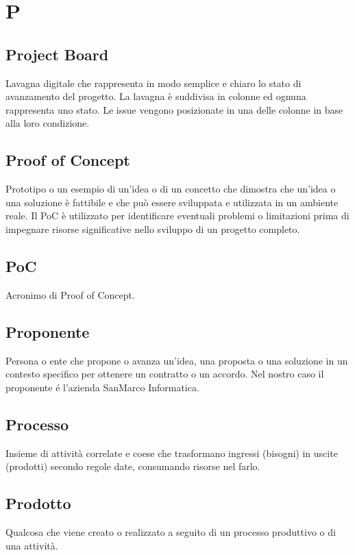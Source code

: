 \section{P}
\subsection{Project Board}%
Lavagna digitale che rappresenta in modo semplice e chiaro lo stato di avanzamento del progetto. La lavagna è suddivisa in colonne ed ognuna rappresenta uno stato.  Le issue vengono posizionate in una delle colonne in base alla loro condizione.
\subsection{Proof of Concept}%
Prototipo o un esempio di un'idea o di un concetto che dimostra che un'idea o una soluzione è fattibile e che può essere sviluppata e 
utilizzata in un ambiente reale. Il PoC è utilizzato per identificare eventuali problemi o limitazioni prima di impegnare risorse 
significative nello sviluppo di un progetto completo.
\subsection{PoC}%
Acronimo di Proof of Concept.
\subsection{Proponente}%
Persona o ente che propone o avanza un'idea, una proposta o una soluzione in un contesto specifico 
per ottenere un contratto o un accordo.
Nel nostro caso il proponente é l'azienda SanMarco Informatica.
\subsection{Processo}%
Insieme di attività correlate e coese che trasformano
ingressi (bisogni) in uscite (prodotti) secondo regole date,
consumando risorse nel farlo.
\subsection{Prodotto}%
Qualcosa che viene creato o realizzato a seguito di un processo 
produttivo o di una attività.

\clearpage